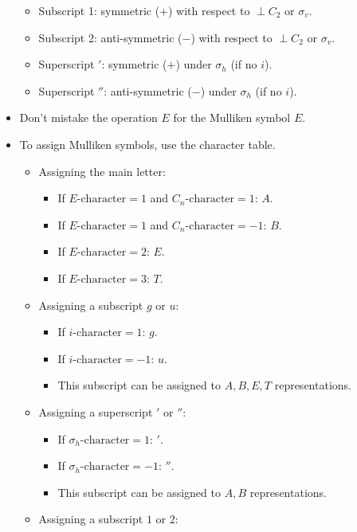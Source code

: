 \documentclass[../notes.tex]{subfiles}
\begin{document}
\begin{itemize}
\begin{itemize}
        \item Subscript 1: symmetric ($+$) with respect to $\perp C_2$ or $\sigma_v$.
        \item Subscript 2: anti-symmetric ($-$) with respect to $\perp C_2$ or $\sigma_v$.
        \item Superscript $'$: symmetric ($+$) under $\sigma_h$ (if no $i$).
        \item Superscript $''$: anti-symmetric ($-$) under $\sigma_h$ (if no $i$).
    \end{itemize}
    \item Don't mistake the operation $E$ for the Mulliken symbol $E$.
    \item To assign Mulliken symbols, use the character table.
    \begin{itemize}
        \item Assigning the main letter:
        \begin{itemize}
            \item If $E\text{-character}=1$ and $C_n\text{-character}=1$: $A$.
            \item If $E\text{-character}=1$ and $C_n\text{-character}=-1$: $B$.
            \item If $E\text{-character}=2$: $E$.
            \item If $E\text{-character}=3$: $T$.
        \end{itemize}
        \item Assigning a subscript $g$ or $u$:
        \begin{itemize}
            \item If $i\text{-character}=1$: $g$.
            \item If $i\text{-character}=-1$: $u$.
            \item This subscript can be assigned to $A,B,E,T$ representations.
        \end{itemize}
        \item Assigning a superscript $'$ or $''$:
        \begin{itemize}
            \item If $\sigma_h\text{-character}=1$: $'$.
            \item If $\sigma_h\text{-character}=-1$: $''$.
            \item This subscript can be assigned to $A,B$ representations.
        \end{itemize}
        \item Assigning a subscript $1$ or $2$:
        \begin{itemize}

\end{itemize}
\end{itemize}
\end{itemize}
\end{document}
